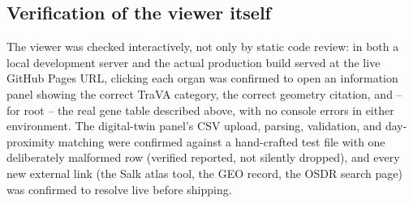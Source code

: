 \subsection{Verification of the viewer itself}

The viewer was checked interactively, not only by static code review: in both a local
development server and the actual production build served at the live GitHub Pages URL,
clicking each organ was confirmed to open an information panel showing the correct TraVA
category, the correct geometry citation, and -- for root -- the real gene table described
above, with no console errors in either environment. The digital-twin panel's CSV upload,
parsing, validation, and day-proximity matching were confirmed against a hand-crafted test
file with one deliberately malformed row (verified reported, not silently dropped), and
every new external link (the Salk atlas tool, the GEO record, the OSDR search page) was
confirmed to resolve live before shipping.
